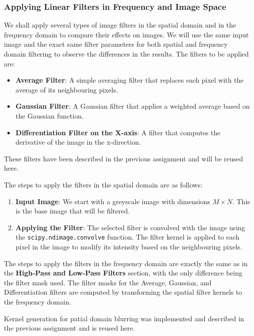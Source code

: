 \documentclass[a4paper,12pt]{article}
\begin{document}
\subsubsection{Applying Linear Filters in Frequency and Image Space}

We shall apply several types of image filters in the spatial domain and in the frequency domain to compare their effects on images. We will use the same input image and the exact same filter parameters for both spatial and frequency domain filtering to observe the differences in the results. The filters to be applied are:

\begin{itemize}
    \item \textbf{Average Filter}:
        A simple averaging filter that replaces each pixel with the average of its neighbouring pixels.
    \item \textbf{Gaussian Filter}:
        A Gaussian filter that applies a weighted average based on the Gaussian function.
    \item \textbf{Differentiation Filter on the X-axis}:
        A filter that computes the derivative of the image in the x-direction.
\end{itemize}

These filters have been described in the previous assignment and will be reused here.

The steps to apply the filters in the spatial domain are as follows:

\begin{enumerate}
    \item \textbf{Input Image}:
        We start with a greyscale image with dimensions \( M \times N \). This is the base image that will be filtered.
    \item \textbf{Applying the Filter}:
        The selected filter is convolved with the image using the \texttt{scipy.ndimage.convolve} function. The filter kernel is applied to each pixel in the image to modify its intensity based on the neighbouring pixels.
\end{enumerate}

The steps to apply the filters in the frequency domain are exactly the same as in the \textbf{High-Pass and Low-Pass Filters} section, with the only difference being the filter mask used. The filter masks for the Average, Gaussian, and Differentiation filters are computed by transforming the spatial filter kernels to the frequency domain.

Kernel generation for patial domain blurring was implemented and described in the previous assignment and is reused here.
\end{document}
